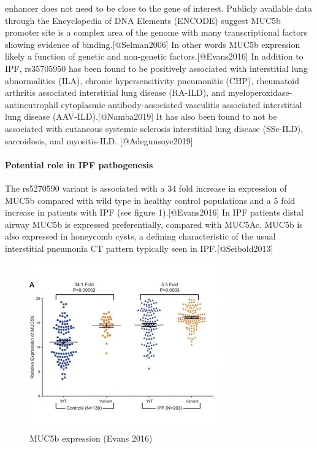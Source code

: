 \documentclass[
]{article}
\begin{document}
enhancer does not need to be close to the gene of interest. Publicly
available data through the Encyclopedia of DNA Elements (ENCODE) suggest
MUC5b promoter site is a complex area of the genome with many
transcriptional factors showing evidence of binding.{[}@Selman2006{]} In
other words MUC5b expression likely a function of genetic and
non-genetic factors.{[}@Evans2016{]} In addition to IPF, rs35705950 has
been found to be positively associated with interstitial lung
abnormalities (ILA), chronic hypersensitivity pneumonitis (CHP),
rheumatoid arthritis associated interstitial lung disease (RA-ILD), and
myeloperoxidase-antineutrophil cytoplasmic antibody-associated
vasculitis associated interstitial lung disease
(AAV-ILD).{[}@Namba2019{]} It has also been found to not be associated
with cutaneous systemic sclerosis interstitial lung disease (SSc-ILD),
sarcoidosis, and myositis-ILD. {[}@Adegunsoye2019{]}

\hypertarget{potential-role-in-ipf-pathogenesis}{%
\paragraph{Potential role in IPF
pathogenesis}\label{potential-role-in-ipf-pathogenesis}}

The rs5270590 variant is associated with a 34 fold increase in
expression of MUC5b compared with wild type in healthy control
populations and a 5 fold increase in patients with IPF (see figure
1).{[}@Evans2016{]} In IPF patients distal airway MUC5b is expressed
preferentially, compared with MUC5Ac. MUC5b is also expressed in
honeycomb cysts, a defining characteristic of the usual interstitial
pneumonia CT pattern typically seen in IPF.{[}@Seibold2013{]}

\begin{figure}
\centering
\includegraphics{source/figures/muc5b_expression.jpg}
\caption{MUC5b expression (Evans 2016)}
\end{figure}
\end{document}
